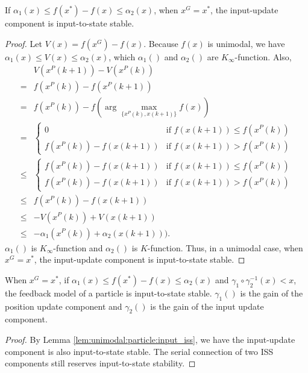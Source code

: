 \begin{mylem}
\label{lem:unimodal:particle:input_iss}
If $ \alpha_{1} (x) \leq f(x^{*}) - f(x) \leq \alpha_{2} (x) $, when $ x^{G} = x^{*} $, the input-update component is input-to-state stable.
\begin{proof}
Let $ V(x) = f(x^{G}) - f(x) $.
Because $ f(x) $ is unimodal, we have
$ \alpha_{1} (x) \leq V(x) \leq \alpha_{2} (x)  $, 
which $ \alpha_{1} () $ and $ \alpha_{2} () $ are $ K_{\infty} $-function.
Also,
\begin{equation}
\begin{aligned}
& V(x^{P}(k+1)) - V(x^{P}(k)) \\
= & f(x^{P} (k)) - f(x^{P} (k+1)) \\
= & f(x^{P}(k)) - f( \arg \max_{ \{ x^{P}(k), x(k+1)  \} } f(x) )  \\
= & 
\left\{\begin{matrix}
0  & \mbox{if } f(x(k+1)) \leq f(x^{P}(k)) \\ 
f(x^{P}(k)) - f(x(k+1)) & \mbox{if } f(x(k+1)) > f(x^{P}(k))
\end{matrix}\right. \\
\leq & 
\left\{\begin{matrix}
f(x^{P}(k)) - f(x(k+1))  & \mbox{if } f(x(k+1)) \leq f(x^{P}(k)) \\ 
f(x^{P}(k)) - f(x(k+1)) & \mbox{if } f(x(k+1)) > f(x^{P}(k))
\end{matrix}\right. \\
\leq & f(x^{P}(k)) - f(x(k+1)) \\
\leq & - V(x^{P}(k)) + V(x(k+1)) \\
\leq & - \alpha_{1} ( x^{P}(k) ) + \alpha_{2} (x(k+1))).
\end{aligned}
\end{equation} 
$ \alpha_{1} () $ is $ K_{\infty} $-function and $ \alpha_{2} () $ is $ K $-function.
Thus, in a unimodal case, when $ x^{G} = x^{*} $, the input-update component is input-to-state stable.
\end{proof}
\end{mylem}

\begin{mylem}
\label{lem:unimodal:particle:iss}
When $ x^{G} = x^{*} $, if $ \alpha_{1} (x) \leq f(x^{*}) - f(x) \leq \alpha_{2} (x) $ and $ \gamma_{1} \circ \gamma_{2}^{-1} (x)  < x $, the feedback model of a particle is input-to-state stable.
$ \gamma_{1} () $ is the gain of the position update component and $ \gamma_{2} () $ is the gain of the input update component.
\begin{proof}
By Lemma \ref{lem:unimodal:particle:input_iss}, we have the input-update component is also input-to-state stable.
The serial connection of two ISS components still reserves input-to-state stability.
\end{proof}
\end{mylem}

